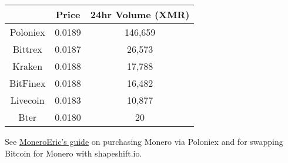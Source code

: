 \begin{itemize}
\begin{table}[htbp!]
\begin{tabular}{ccc}
					\hline
						&Price	&24hr Volume (XMR) \\
					\hline
					Poloniex	&0.0189	&146,659 \\
					\hline
					Bittrex	&0.0187	&26,573 \\
					\hline
					Kraken	&0.0188	&17,788 \\
					\hline
					BitFinex	&0.0188	&16,482 \\
					\hline
					Livecoin	&0.0183	&10,877 \\
					\hline	
					Bter	&0.0180	&20 \\
					\hline
				\end{tabular}
			\end{table}
	\end{itemize}
	See \href{https://moneroeric.com/buy-monero-bitcoin-shapeshift-poloniex/}{MoneroEric's guide} on purchasing Monero via Poloniex and for swapping Bitcoin for Monero with shapeshift.io.

